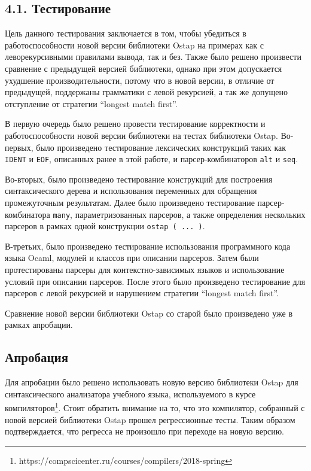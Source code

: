 \subsection*{4.1. Тестирование}
Цель данного тестирования заключается в том, чтобы убедиться в работоспособности новой версии библиотеки Ostap на примерах как с леворекурсивными правилами вывода, так и без. Также было решено произвести сравнение с предыдущей версией библиотеки, однако при этом допускается ухудшение производительности, потому что в новой версии, в отличие от предыдущей, поддержаны грамматики с левой рекурсией, а так же допущено отступление от стратегии ``longest match first''.

В первую очередь было решено провести тестирование корректности и работоспособности новой версии библиотеки на тестах библиотеки Ostap. Во-первых, было произведено тестирование лексических конструкций таких как \lstinline|IDENT| и \lstinline|EOF|, описанных ранее в этой работе, и парсер-комбинаторов  \lstinline|alt| и  \lstinline|seq|.

Во-вторых, было произведено тестирование конструкций для построения синтаксического дерева и использования переменных для обращения промежуточным результатам. Далее было произведено тестирование парсер-комбинатора \lstinline|many|, параметризованных парсеров, а также определения нескольких парсеров в рамках одной конструкции \lstinline|ostap ( ... )|.

В-третьих, было произведено тестирование использования программного кода языка Ocaml, модулей и классов при описании парсеров. Затем были протестированы парсеры для контекстно-зависимых языков и использование условий при описании парсеров. После этого было произведено тестирование для парсеров с левой рекурсией и нарушением стратегии ``longest match first''.

Сравнение новой версии библиотеки Ostap со старой было произведено уже в рамках апробации.

\subsection{Апробация}
Для апробации было решено использовать новую версию библиотеки Ostap для синтаксического анализатора учебного языка, используемого в курсе
компиляторов\footnote{https://compscicenter.ru/courses/compilers/2018-spring}. Стоит обратить внимание на то, что это компилятор, собранный с новой версией библиотеки Ostap прошел регрессионные тесты. Таким образом подтверждается, что регресса не произошло при переходе на новую версию.

